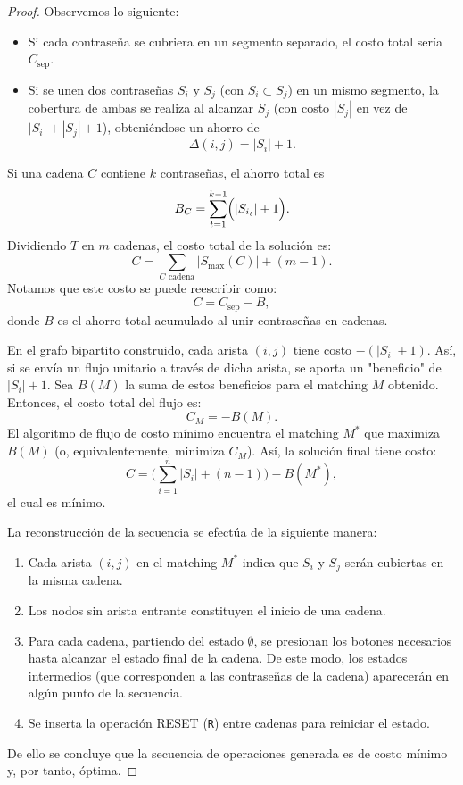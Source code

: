 ﻿\documentclass{article}
\theoremstyle{plain}
\theoremstyle{definition}
\begin{document}
\begin{proof}
Observemos lo siguiente:
\begin{itemize}
    \item Si cada contraseña se cubriera en un segmento separado, el costo total sería \(C_{\text{sep}}\).
    \item Si se unen dos contraseñas \(S_i\) y \(S_j\) (con \(S_i\subset S_j\)) en un mismo segmento, la cobertura de ambas se realiza al alcanzar \(S_j\) (con costo \(|S_j|\) en vez de \(|S_i|+|S_j|+1\)), obteniéndose un ahorro de
    \[
    \Delta(i,j)=|S_i|+1.
    \]
\end{itemize}

Si una cadena \(C\) contiene \(k\) contraseñas, el ahorro total es
\[
B_C=\sum_{t=1}^{k-1} \Bigl(|S_{i_t}|+1\Bigr).
\]
Dividiendo \(T\) en \(m\) cadenas, el costo total de la solución es:
\[
C = \sum_{C \text{ cadena}} |S_{\max}(C)| + (m-1).
\]
Notamos que este costo se puede reescribir como:
\[
C = C_{\text{sep}} - B,
\]
donde \(B\) es el ahorro total acumulado al unir contraseñas en cadenas.

En el grafo bipartito construido, cada arista \((i,j)\) tiene costo \( -(|S_i|+1)\). Así, si se envía un flujo unitario a través de dicha arista, se aporta un "beneficio" de \(|S_i|+1\). Sea \(B(M)\) la suma de estos beneficios para el matching \(M\) obtenido. Entonces, el costo total del flujo es:
\[
C_M = -B(M).
\]
El algoritmo de flujo de costo mínimo encuentra el matching \(M^*\) que maximiza \(B(M)\) (o, equivalentemente, minimiza \(C_M\)). Así, la solución final tiene costo:
\[
C = \Biggl(\sum_{i=1}^{n}|S_i|+(n-1)\Biggr) - B(M^*),
\]
el cual es mínimo.

La reconstrucción de la secuencia se efectúa de la siguiente manera:
\begin{enumerate}
    \item Cada arista \((i,j)\) en el matching \(M^*\) indica que \(S_i\) y \(S_j\) serán cubiertas en la misma cadena.
    \item Los nodos sin arista entrante constituyen el inicio de una cadena.
    \item Para cada cadena, partiendo del estado \(\emptyset\), se presionan los botones necesarios hasta alcanzar el estado final de la cadena. De este modo, los estados intermedios (que corresponden a las contraseñas de la cadena) aparecerán en algún punto de la secuencia.
    \item Se inserta la operación RESET (\texttt{R}) entre cadenas para reiniciar el estado.
\end{enumerate}
De ello se concluye que la secuencia de operaciones generada es de costo mínimo y, por tanto, óptima.
\end{proof}
\end{document}
